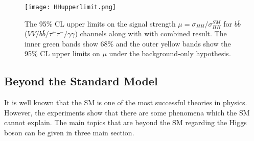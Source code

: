 \begin{figure}[ht]
	\centering
	\texttt{[image: HHupperlimit.png]}
	\vspace{2mm}
	\caption[The 95\% CL upper limits on the signal strength $\mu = \sigma_{HH} / \sigma_{HH}^{SM}$ for $b\bar b$($VV/b\bar b/\tau^+\tau^-/\gamma\gamma$) channels along with with combined result. The inner green bands show 68\% and the outer yellow bands show the 95\% CL upper limits on $\mu$ under the background-only hypothesis.]
	{The 95\% CL upper limits on the signal strength $\mu = \sigma_{HH} / \sigma_{HH}^{SM}$ for $b\bar b$($VV/b\bar b/\tau^+\tau^-/\gamma\gamma$) channels along with with combined result. The inner green bands show 68\% and the outer yellow bands show the 95\% CL upper limits on $\mu$ under the background-only hypothesis\cite{Sirunyan2019}.}
	\label{HHupperlimit}
\end{figure}




\subsection{Beyond the Standard Model}

It is well known that the SM is one of the most successful theories in physics. However, the experiments show that there are some phenomena which the SM cannot explain. The main topics that are beyond the SM regarding the Higgs boson can be given in three main section.

